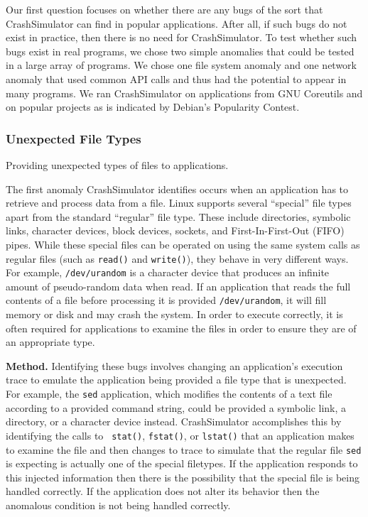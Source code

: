 Our first question focuses on whether there are any bugs of the sort that
CrashSimulator can find in popular applications.  After all, if such bugs
do not exist in practice, then there is no need for CrashSimulator.
To test whether such bugs exist in real programs, we 
chose two simple anomalies that could be tested in a large
array of programs.  We chose one file system anomaly and one network anomaly 
that used common API calls and thus had the potential to appear in
many programs.  We ran CrashSimulator on applications from GNU Coreutils and
on popular projects as is indicated by Debian's Popularity Contest\cite{DebPopCon}.

\subsubsection{Unexpected File Types} Providing unexpected types of files to
applications.

The first anomaly CrashSimulator identifies occurs when an
application has to retrieve and process data from a file.  Linux supports
several ``special'' file types apart from the standard ``regular'' file type.
These include directories, symbolic links, character devices, block devices,
sockets, and First-In-First-Out (FIFO) pipes.  While these special files can
be operated on using the same system calls as regular files 
(such as {\tt read()} and {\tt write()}), they behave in very different
ways.  For example, {\tt /dev/urandom} is a character device that produces
an infinite amount of pseudo-random data when read.
If an application that reads the full contents of a file
before processing it is provided {\tt /dev/urandom}, it will fill memory
or disk and may crash the system\cite{YumAptEndless}.
In order to execute correctly, it is often required for applications to 
examine the files in order to ensure they are of an appropriate type.

{\bf Method.}  Identifying these bugs involves changing an application's
execution trace to emulate the application being provided a file type that is
unexpected.  For example, the {\tt sed} application, which modifies the contents
of a text file according to a provided command string, could be provided
a symbolic link, a directory, or a character device
instead.  CrashSimulator accomplishes this by identifying the calls to {\tt
  stat()}, {\tt fstat()}, or {\tt lstat()} that an application makes to examine
the file and then changes to trace to simulate that the regular file {\tt sed}
is expecting is actually one of the special filetypes.  If the application
responds to this injected information then there is the possibility that the
special file is being handled correctly.  If the application does not alter its
behavior then the anomalous condition is not being handled correctly.

